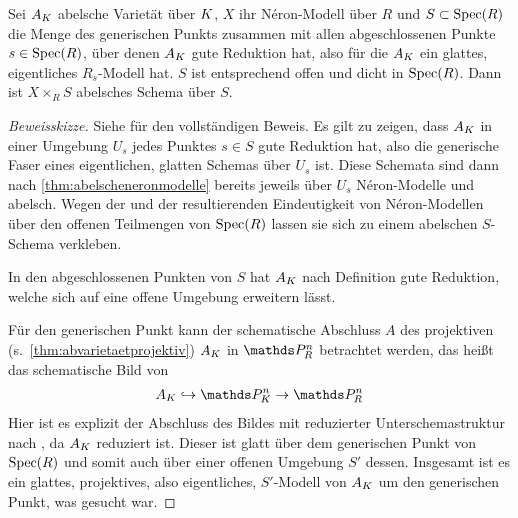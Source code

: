 \begin{Satz}\label{thm:teilwabelscheneronmodelle}
  Sei $A_{K}$ abelsche Varietät über $K$,
  $X$ ihr Néron-Modell über $R$ und
  $S\subset\operatorname{Spec}(R)$ die Menge des generischen Punkts zusammen mit
  allen abgeschlossenen Punkte $s\in\operatorname{Spec}(R)$, über denen $A_{K}$ gute
  Reduktion hat, also für die $A_{K}$ ein glattes, eigentliches
  $R_s$-Modell hat.
  $S$ ist entsprechend offen und dicht in $\operatorname{Spec}(R)$.
  Dann ist $X\times_R S$ abelsches Schema über $S$.
  \begin{proof}[Beweisskizze] Siehe \cite[Theorem~1.4/3]{neron} für
    den vollständigen Beweis.
    Es gilt zu zeigen, dass $A_{K}$ in einer Umgebung $U_s$ jedes
    Punktes $s\in S$ gute Reduktion hat, also die generische Faser eines
    eigentlichen, glatten Schemas über $U_s$ ist.
    Diese Schemata sind dann nach \ref{thm:abelscheneronmodelle}
    bereits jeweils über $U_s$ Néron-Modelle und abelsch.
    Wegen der \NAbbEig und der resultierenden Eindeutigkeit von
    Néron-Modellen über den offenen Teilmengen von $\operatorname{Spec}(R)$
    lassen sie sich zu einem abelschen $S$-Schema verkleben.

    In den abgeschlossenen Punkten von $S$ hat $A_{K}$ nach Definition
    gute Reduktion, welche sich auf eine offene Umgebung erweitern
    lässt.
    
    Für den generischen Punkt kann der schematische
    Abschluss $A$ des projektiven (s.~\ref{thm:abvarietaetprojektiv})
    $A_{K}$ in $\P_R^n$ betrachtet werden, das heißt das schematische
    Bild von
    \begin{gather*}
      A_\K\hookrightarrow\P_\K^n\to\P_R^n
    \end{gather*}
    Hier ist es explizit der Abschluss des Bildes mit reduzierter
    Unterschemastruktur nach \cite[Remark~10.32]{wedhorn}, da $A_{K}$
    reduziert ist.
    Dieser ist glatt über dem generischen Punkt von $\operatorname{Spec}(R)$
    und somit auch über einer offenen Umgebung $S'$ dessen.
    Insgesamt ist es ein glattes, projektives, also eigentliches,
    $S'$-Modell von $A_{K}$ um den generischen Punkt, was gesucht war.
  \end{proof}
\end{Satz}


